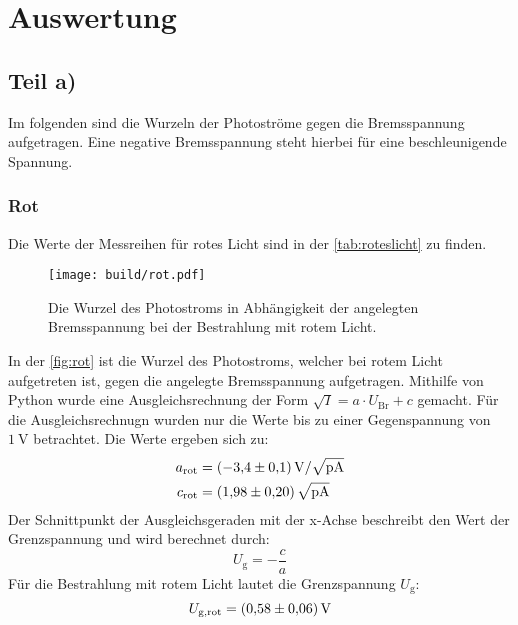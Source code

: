 \section{Auswertung}
\label{sec:Auswertung}
\subsection{Teil a)}
Im folgenden sind die Wurzeln der Photoströme gegen die Bremsspannung aufgetragen. 
Eine negative Bremsspannung steht hierbei für eine beschleunigende Spannung.

\subsubsection{Rot}
Die Werte der Messreihen für rotes Licht sind in der \autoref{tab:roteslicht} zu finden. 
\begin{figure}
  \centering
  \texttt{[image: build/rot.pdf]}
  \caption{Die Wurzel des Photostroms in Abhängigkeit der angelegten Bremsspannung bei der Bestrahlung mit rotem Licht.}
  \label{fig:rot}
\end{figure}
\noindent
In der \autoref{fig:rot} ist die Wurzel des Photostroms, welcher bei rotem Licht aufgetreten ist, gegen die angelegte Bremsspannung aufgetragen.
Mithilfe von Python wurde eine Ausgleichsrechnung der Form $\sqrt{I} = a \cdot U_{\text{Br}} + c $ gemacht.
Für die Ausgleichsrechnugn wurden nur die Werte bis zu einer Gegenspannung von $\SI{1}{\volt}$ betrachtet.
Die Werte ergeben sich zu:
\begin{align*}
  a_{\text{rot}} &= \SI{-3.4 \pm 0.1}{\volt\per\sqrt{\pico\ampere}}\\
  c_{\text{rot}} &= \SI{1.98 \pm 0.2}{\sqrt{\pico\ampere}}
\end{align*}
Der Schnittpunkt der Ausgleichsgeraden mit der x-Achse beschreibt den Wert der Grenzspannung und wird berechnet durch:
\begin{equation}\label{eqn:U_G}
  U_{\text{g}}=-\frac{c}{a}
\end{equation}
Für die Bestrahlung mit rotem Licht lautet die Grenzspannung $U_{\text{g}}$:
\begin{equation*}
  U_{\text{g},\text{rot}} = \SI{0.58\pm0.06}{\volt}
\end{equation*}


